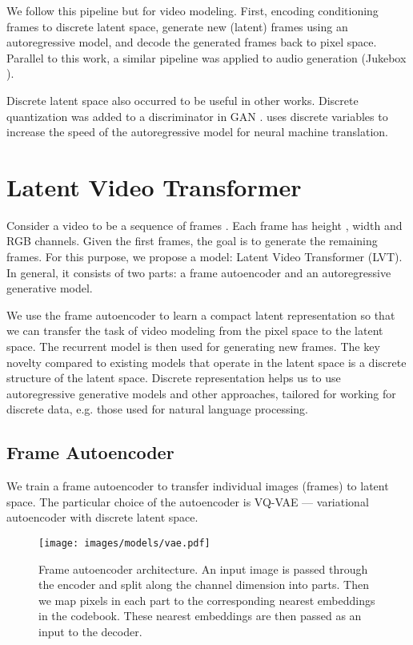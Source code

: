 \documentclass{article}
\begin{document}
We follow this pipeline but for video modeling. First, encoding conditioning frames to discrete latent space, generate new (latent) frames using an autoregressive model, and decode the generated frames back to pixel space. Parallel to this work, a similar pipeline was applied to audio generation (Jukebox \cite{jukebox}).

Discrete latent space also occurred to be useful in other works. Discrete quantization was added to a discriminator in GAN \cite{quantization_gan}. \cite{lt} uses discrete variables to increase the speed of the autoregressive model for neural machine translation. \section{Latent Video Transformer}

Consider a video  to be a sequence of  frames . Each frame  has height , width  and  RGB channels. Given the first  frames, the goal is to generate the remaining  frames. For this purpose, we propose a model: Latent Video Transformer (LVT). In general, it consists of two parts: a frame autoencoder and an autoregressive generative model.

We use the frame autoencoder to learn a compact latent representation so that we can transfer the task of video modeling from the pixel space to the latent space. The recurrent model is then used for generating new frames. The key novelty compared to existing models that operate in the latent space is a discrete structure of the latent space. Discrete representation helps us to use autoregressive generative models and other approaches, tailored for working for discrete data, e.g. those used for natural language processing.

\subsection{Frame Autoencoder}

We train a frame autoencoder to transfer individual images (frames) to latent space. The particular choice of the autoencoder is VQ-VAE \cite{vqvae} --- variational autoencoder with discrete latent space.

\begin{figure}[h!]
\centering
\texttt{[image: images/models/vae.pdf]}
\caption{Frame autoencoder architecture. An input image is passed through the encoder and split along the channel dimension into  parts. Then we map pixels in each part to the corresponding nearest embeddings in the codebook. These nearest embeddings are then passed as an input to the decoder.}
\label{fig:ae}
\end{figure}
\end{document}
